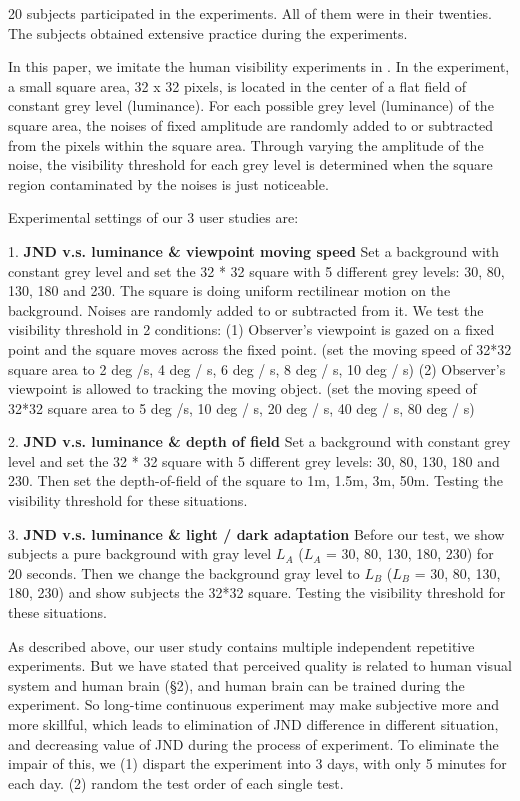 20 subjects participated in the experiments. All of them were in their twenties. The subjects obtained extensive practice during the experiments.

In this paper, we imitate the human visibility experiments in \cite{PSPNR}. In the experiment, a small square area, 32 x 32 pixels, is located in the center of a flat field of constant grey level (luminance). For each possible grey level (luminance) of the square area, the noises of fixed amplitude are randomly added to or subtracted from the pixels within the square area. Through varying the amplitude of the noise, the visibility threshold for each grey level is determined when the square region contaminated by the noises is just noticeable. 

Experimental settings of our 3 user studies are:

1. \textbf{JND v.s. luminance \& viewpoint moving speed} Set a background with constant grey level and set the 32 * 32 square with 5 different grey levels: 30, 80, 130, 180 and 230. The square is doing uniform rectilinear motion on the background. Noises are randomly added to or subtracted from it. We test the visibility threshold in 2 conditions: (1) Observer's viewpoint is gazed on a fixed point and the square moves across the fixed point. (set the moving speed of 32*32 square area to 2 deg /s, 4 deg / s, 6 deg / s, 8 deg / s, 10 deg / s) (2) Observer's viewpoint is allowed to tracking the moving object. (set the moving speed of 32*32 square area to 5 deg /s, 10 deg / s, 20 deg / s, 40 deg / s, 80 deg / s)

2. \textbf{JND v.s. luminance \& depth of field} Set a background with constant grey level and set the 32 * 32 square with 5 different grey levels: 30, 80, 130, 180 and 230. Then set the depth-of-field of the square to 1m, 1.5m, 3m, 50m. Testing the visibility threshold for these situations.

3. \textbf{JND v.s. luminance \& light / dark adaptation} Before our test, we show subjects a pure background with gray level $L_A$ ($L_A$ = 30, 80, 130, 180, 230) for 20 seconds. Then we change the background gray level to $L_B$ ($L_B$ = 30, 80, 130, 180, 230) and show subjects the 32*32 square. Testing the visibility threshold for these situations.

As described above, our user study contains multiple independent repetitive experiments. But we have stated that perceived quality is related to human visual system and human brain (\S 2), and human brain can be trained during the experiment. So long-time continuous experiment may make subjective more and more skillful, which leads to elimination of JND difference in different situation, and decreasing value of JND during the process of experiment. To eliminate the impair of this, we (1) dispart the experiment into 3 days, with only 5 minutes for each day. (2) random the test order of each single test.

